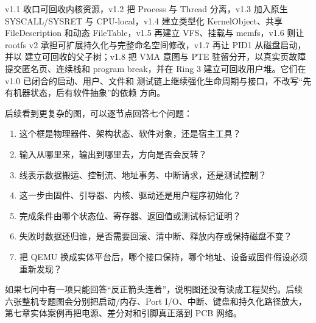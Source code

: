 %
v1.1 收口可回收内核资源，v1.2 把 Process 与 Thread 分离，v1.3 加入原生
SYSCALL/SYSRET 与 CPU-local，v1.4 建立类型化 KernelObject、共享
FileDescription 和动态 FileTable，v1.5 再建立 VFS、挂载与 memfs，v1.6
则让 rootfs v2 承担可扩展持久化与完整命名空间修改，v1.7 再让 PID1
从磁盘启动，并以  建立可回收的父子树；v1.8
把 VMA 意图与 PTE 驻留分开，以真实页故障提交匿名页、连续栈和 program
break，并在 Ring 3 建立可回收用户堆。它们在
v1.0 已闭合的启动、用户、文件和
测试链上继续强化生命周期与接口，不改写“先有机器状态，后有软件抽象”的依赖
方向。

后续看到更复杂的图，可以逐节点回答七个问题：

\begin{enumerate}[leftmargin=2.2em]
  \item 这个框是物理器件、架构状态、软件对象，还是宿主工具？
  \item 输入从哪里来，输出到哪里去，方向是否会反转？
  \item 线表示数据搬运、控制流、地址事务、中断请求，还是测试控制？
  \item 这一步由固件、引导器、内核、驱动还是用户程序初始化？
  \item 完成条件由哪个状态位、寄存器、返回值或测试标记证明？
  \item 失败时数据还归谁，是否需要回滚、清中断、释放内存或保持磁盘不变？
  \item 把 QEMU 换成实体平台后，哪个接口保持，哪个地址、设备或固件假设必须
        重新发现？
\end{enumerate}

如果七问中有一项只能回答“反正箭头连着”，说明图还没有读成工程契约。后续
六张整机专题图会分别把启动/内存、Port I/O、中断、键盘和持久化路径放大，
第七章实体案例再把电源、差分对和引脚真正落到 PCB 网络。
